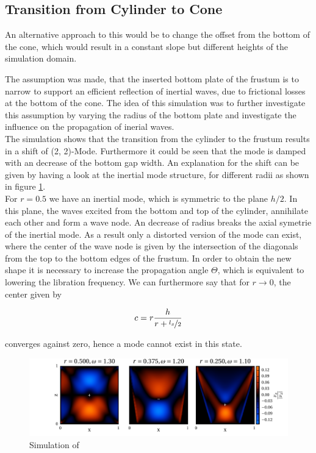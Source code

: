{\subsection{Transition from Cylinder to Cone}

An alternative approach to this would be to change the offset from the bottom of the cone, which would result in a constant
slope but different heights of the simulation domain.

The assumption was made, that the inserted bottom plate of the frustum is to narrow to support an efficient reflection
of inertial waves, due to frictional losses at the bottom of the cone.
The idea of this simulation was to further investigate this assumption by varying the radius of the bottom plate and investigate
the influence on the propagation of inerial waves.\\
The simulation shows that the transition from the cylinder
to the frustum results in a shift of (2, 2)-Mode.
Furthermore it could be seen that the mode is damped with an decrease of the bottom gap width.
An explanation for the shift can be given
by having a look at the inertial mode structure, for different radii as shown in figure \ref{fig:cone:phase}.\\
For $r=0.5$ we have an inertial mode, which is symmetric to the plane $h/2$.
In this plane, the waves excited from the bottom and top of the cylinder, annihilate each other and form a wave node.
An decrease of radius breaks the axial symetrie of the inertial mode.
As a result only a distorted version of the mode can exist, where the center of the wave node
is given by the intersection of the diagonals from the top to the bottom edges of the frustum.
In order to obtain the new shape it is necessary to increase the propagation angle $\Theta$,
which is equivalent to lowering the libration frequency.
We can furthermore say that for $r \rightarrow 0$, the center given by

\begin{align}
c  = r \frac{h}{r+\nicefrac{l_x}{2}}
\end{align}

converges against zero, hence a mode cannot exist in this state.

\begin{figure}[!pt]
  \centering
  \includegraphics{gfx/cone/transition/phase.pdf}
  \caption{\label{fig:cone:phase}
    Simulation of
  }
\end{figure}


}
